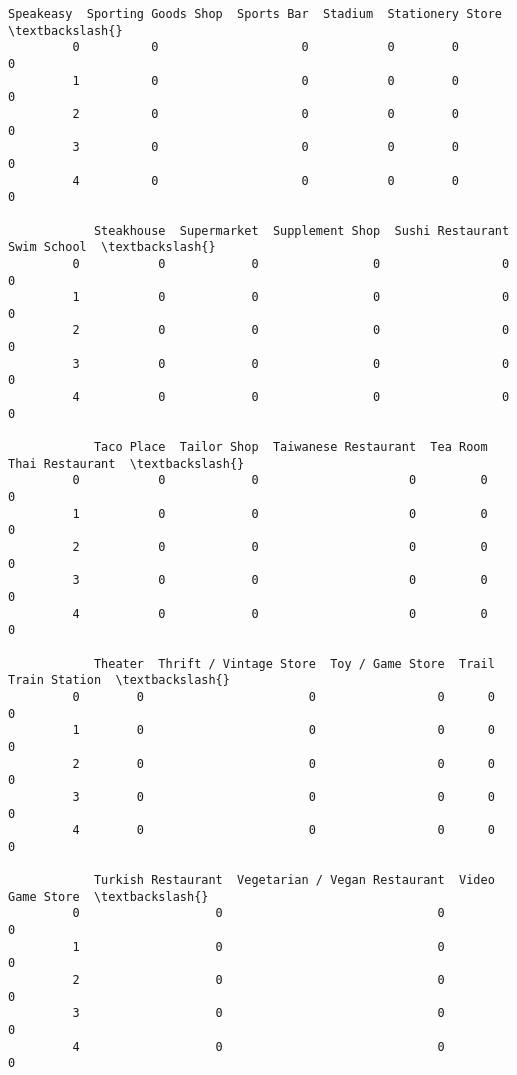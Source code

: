 \documentclass[11pt]{article}
\begin{document}
\begin{Verbatim}[commandchars=\\\{\}]
            Speakeasy  Sporting Goods Shop  Sports Bar  Stadium  Stationery Store  \textbackslash{}
         0          0                    0           0        0                 0   
         1          0                    0           0        0                 0   
         2          0                    0           0        0                 0   
         3          0                    0           0        0                 0   
         4          0                    0           0        0                 0   
         
            Steakhouse  Supermarket  Supplement Shop  Sushi Restaurant  Swim School  \textbackslash{}
         0           0            0                0                 0            0   
         1           0            0                0                 0            0   
         2           0            0                0                 0            0   
         3           0            0                0                 0            0   
         4           0            0                0                 0            0   
         
            Taco Place  Tailor Shop  Taiwanese Restaurant  Tea Room  Thai Restaurant  \textbackslash{}
         0           0            0                     0         0                0   
         1           0            0                     0         0                0   
         2           0            0                     0         0                0   
         3           0            0                     0         0                0   
         4           0            0                     0         0                0   
         
            Theater  Thrift / Vintage Store  Toy / Game Store  Trail  Train Station  \textbackslash{}
         0        0                       0                 0      0              0   
         1        0                       0                 0      0              0   
         2        0                       0                 0      0              0   
         3        0                       0                 0      0              0   
         4        0                       0                 0      0              0   
         
            Turkish Restaurant  Vegetarian / Vegan Restaurant  Video Game Store  \textbackslash{}
         0                   0                              0                 0   
         1                   0                              0                 0   
         2                   0                              0                 0   
         3                   0                              0                 0   
         4                   0                              0                 0   
         

\end{Verbatim}
\end{document}
